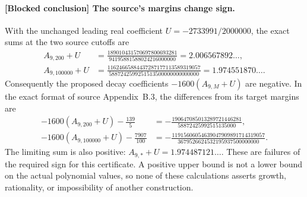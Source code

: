 \paragraph{[Blocked conclusion] The source's margins change sign.}
With the unchanged leading real coefficient
$U=-2733991/2000000$, the exact sums at the two source cutoffs are
\begin{align*}
 A_{9,200}+U
 &=\frac{189010431570697800693281}{94195881588024216000000}
   =2.006567892\ldots,\\
 A_{9,100000}+U
 &=\frac{11624665884437287177113589319057}
          {5887242599251513500000000000000}
   =1.974551870\ldots.
\end{align*}
Consequently the proposed decay coefficients $-1600(A_{9,M}+U)$
are negative.  In the exact format of source Appendix~B.3, the
differences from its target margins are
\begin{align*}
 -1600(A_{9,200}+U)-\frac{139}{5}
 &=-\frac{190647085013289721446281}{58872425992515135000},\\
 -1600(A_{9,100000}+U)-\frac{7907}{100}
 &=-\frac{11915606054639047909891714319057}
           {3679526624532195937500000000}.
\end{align*}
The limiting sum is also positive:
$A_{9,*}+U=1.974487121\ldots$.
These are failures of the required sign for this certificate.
A positive upper bound is not a lower bound on the actual polynomial
values, so none of these calculations asserts growth, rationality,
or impossibility of another construction.
